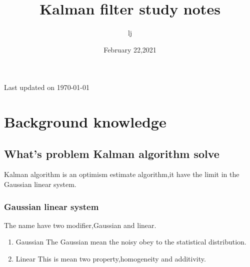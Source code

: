 \documentclass{article}
\begin{document}
\title{Kalman filter study notes}
\author{lj}
\date{February 22,2021}
\newcommand{\updateinfo}[1][\today]{\par\vfill\hfill{\scriptsize\color{gray}Last updated on #1}}

\maketitle
\tableofcontents
\updateinfo{}
\newpage
\newpage

\section{Background knowledge}
\subsection{What's problem Kalman algorithm solve}
Kalman algorithm is an optimism estimate algorithm,it have the limit in the Gaussian linear system.
\subsubsection{Gaussian linear system}
The name have two modifier,Gaussian and linear.
\begin{enumerate}
    \item Gaussian
        The Gaussian mean the noisy obey to the statistical distribution.
    \item Linear
        This is mean two property,homogeneity and additivity.
\end{enumerate}
\end{document}
